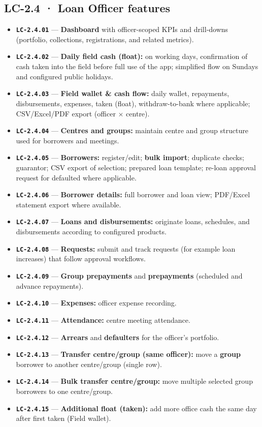 \documentclass[11pt,a4paper]{article}
\newcommand{\LC}[1]{\textbf{\texttt{#1}}}
\begin{document}
\subsection*{LC-2.4 · Loan Officer features}
\begin{itemize}
  \item \LC{LC-2.4.01} --- \textbf{Dashboard} with officer-scoped KPIs and drill-downs (portfolio, collections, registrations, and related metrics).
  \item \LC{LC-2.4.02} --- \textbf{Daily field cash (float):} on working days, confirmation of cash taken into the field before full use of the app; simplified flow on Sundays and configured public holidays.
  \item \LC{LC-2.4.03} --- \textbf{Field wallet \& cash flow:} daily wallet, repayments, disbursements, expenses, taken (float), withdraw-to-bank where applicable; CSV/Excel/PDF export (officer $\times$ centre).
  \item \LC{LC-2.4.04} --- \textbf{Centres and groups:} maintain centre and group structure used for borrowers and meetings.
  \item \LC{LC-2.4.05} --- \textbf{Borrowers:} register/edit; \textbf{bulk import}; duplicate checks; guarantor; CSV export of selection; prepared loan template; re-loan approval request for defaulted where applicable.
  \item \LC{LC-2.4.06} --- \textbf{Borrower details:} full borrower and loan view; PDF/Excel statement export where available.
  \item \LC{LC-2.4.07} --- \textbf{Loans and disbursements:} originate loans, schedules, and disbursements according to configured products.
  \item \LC{LC-2.4.08} --- \textbf{Requests:} submit and track requests (for example loan increases) that follow approval workflows.
  \item \LC{LC-2.4.09} --- \textbf{Group prepayments} and \textbf{prepayments} (scheduled and advance repayments).
  \item \LC{LC-2.4.10} --- \textbf{Expenses:} officer expense recording.
  \item \LC{LC-2.4.11} --- \textbf{Attendance:} centre meeting attendance.
  \item \LC{LC-2.4.12} --- \textbf{Arrears} and \textbf{defaulters} for the officer's portfolio.
  \item \LC{LC-2.4.13} --- \textbf{Transfer centre/group (same officer):} move a \textbf{group} borrower to another centre/group (single row).
  \item \LC{LC-2.4.14} --- \textbf{Bulk transfer centre/group:} move multiple selected group borrowers to one centre/group.
  \item \LC{LC-2.4.15} --- \textbf{Additional float (taken):} add more office cash the same day after first taken (Field wallet).
\end{itemize}
\end{document}
